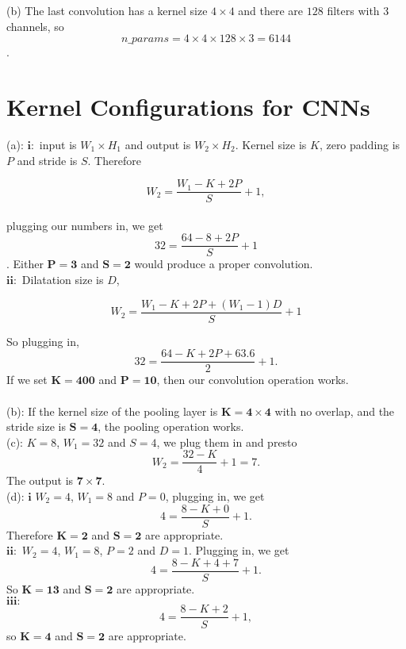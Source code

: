 \documentclass{amsart}
\theoremstyle{definition}
\theoremstyle{remark}
\numberwithin{equation}{section}
\begin{document}
(b) The last convolution has a kernel size $4 \times 4$ and there are $128$
filters with 3 channels, so $$n\_params = 4 \times 4 \times 128 \times 3 = 6144$$. \\

\section{Kernel Configurations for CNNs}

(a): $\bm{i}:$ input is $W_1\times H_1$ and output is $W_2\times H_2$.
Kernel size is $K$, zero padding is $P$ and stride is $S$. Therefore

\begin{equation}
W_2= \frac{W_1-K+2P}{S}+1,
\end{equation} \\

plugging our numbers in, we get $$32=\frac{64-8+2P}{S}+1$$. Either $\bm{P=3}$
and $\bm{S=2}$ would produce a proper convolution.\\

$\bm{ii}:$ Dilatation size is $D$,

\begin{equation}
W_2= \frac{W_1-K+2P+(W_1-1)D}{S}+1
\end{equation}

So plugging in, $$32= \frac{64-K+2P+63.6}{2}+1.$$ If we set $\bm{K=400}$ and
$\bm{P=10}$, then our convolution operation works.\\\\

(b): If the kernel size of the pooling layer is $\bm{K=4\times4}$ with no
overlap, and the stride size is $\bm{S=4}$, the pooling operation
works.\\

(c): $K=8$, $W_1=32$ and $S=4$, we plug them in and presto
$$W_2= \frac{32-K}{4}+1=7.$$ The output is $\bm{7\times7}.$ \\

(d): $\bm{i}$ $W_2=4$, $W_1=8$ and $P=0$, plugging in, we get
$$4=\frac{8-K+0}{S}+1.$$ Therefore $\bm{K=2}$ and $\bm{S=2}$ are appropriate. \\

$\bm{ii}:$ $W_2=4$, $W_1=8$, $P=2$ and $D=1$. Plugging in, we get
$$4= \frac{8-K+4+7}{S}+1.$$ So $\bm{K=13}$ and $\bm{S=2}$ are appropriate.\\

$\bm{iii}:$ $$4=\frac{8-K+2}{S}+1,$$ so $\bm{K=4}$ and $\bm{S=2}$
are appropriate. \\
\end{document}
